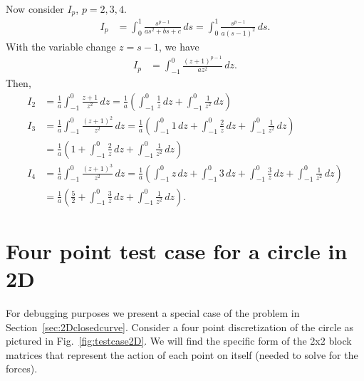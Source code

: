 \documentclass[12pt]{article}
\newcommand{\baas}[1]{\begin{align*} #1 \end{align*}}
\begin{document}
Now consider $I_p$, $p=2,3,4$.
\baas{	
I_p & = \int_0^1 \frac{s^{p-1}}{as^2 + bs + c} \, ds  = \int_0^1 \frac{s^{p-1}}{a(s-1)^2} \, ds.
}
With the variable change $z = s-1$, we have
\baas{	
I_p & = \int_{-1}^0 \frac{(z+1)^{p-1}}{az^2} \, dz.
}
Then,
\baas{
I_2 &=  \frac{1}{a}\int_{-1}^0 \frac{z+1}{z^2} \, dz = \frac{1}{a}\left(\int_{-1}^0 \frac{1}{z} \, dz + \int_{-1}^0 \frac{1}{z^2} \, dz \right) \\ 
I_3 & = \frac{1}{a}\int_{-1}^0 \frac{(z+1)^2}{z^2} \, dz = \frac{1}{a}\left(\int_{-1}^0 1 \, dz + \int_{-1}^0 \frac{2}{z} \, dz + \int_{-1}^0 \frac{1}{z^2} \, dz \right) \\
&= \frac{1}{a}\left(1 + \int_{-1}^0 \frac{2}{z} \, dz + \int_{-1}^0 \frac{1}{z^2} \, dz \right) \\
I_4 & = \frac{1}{a}\int_{-1}^0 \frac{(z+1)^3}{z^2} \, dz = \frac{1}{a}\left(\int_{-1}^0 z \, dz + \int_{-1}^0 3 \, dz + \int_{-1}^0 \frac{3}{z} \, dz + \int_{-1}^0 \frac{1}{z^2} \, dz \right) \\
&= \frac{1}{a}\left(\frac{5}{2} + \int_{-1}^0 \frac{3}{z} \, dz + \int_{-1}^0 \frac{1}{z^2} \, dz \right).
}



\section{Four point test case for a circle in 2D}\label{app:2Dtestcase}
For debugging purposes we present a special case of the problem in Section~\ref{sec:2Dclosedcurve}. Consider a four point discretization of the circle as pictured in Fig.~\ref{fig:testcase2D}. We will find the specific form of the 2x2 block matrices that represent the action of each point on itself (needed to solve for the forces).
\end{document}
